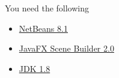 \begin{frame}{You need the following}
	\begin{itemize}
		\item \href{https://netbeans.org/downloads/}{NetBeans 8.1}
		\item \href{http://www.oracle.com/technetwork/java/javafxscenebuilder-1x-archive-2199384.html\#javafx-scenebuilder-2.0-oth-JPR}{JavaFX Scene Builder 2.0}
		\item \href{http://www.oracle.com/technetwork/java/javase/downloads/jdk8-downloads-2133151.html}{JDK 1.8}
	\end{itemize}
\end{frame}
